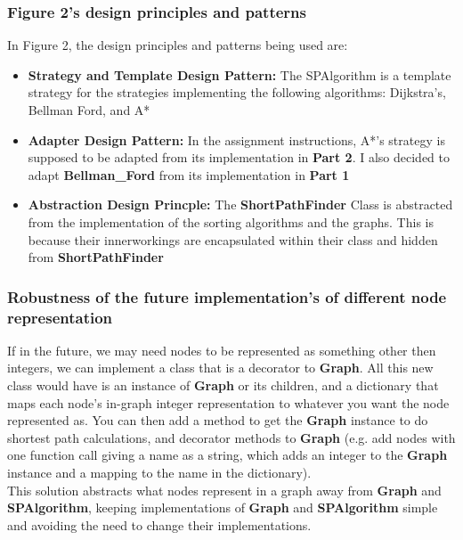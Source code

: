 \documentclass[letterpaper]{article}
\theoremstyle{plain}
\theoremstyle{definition}
\theoremstyle{remark}
\begin{document}
\subsubsection*{Figure 2's design principles and patterns}
In Figure 2, the design principles and patterns being used are:
\begin{itemize}
  \item \textbf{Strategy and Template Design Pattern:} The SPAlgorithm is a template strategy for the strategies implementing the following algorithms: Dijkstra's, Bellman Ford, and A* 
  \item \textbf{Adapter Design Pattern:} In the assignment instructions, A*'s strategy is supposed to be adapted from its implementation in \textbf{Part 2}. I also decided to adapt \textbf{Bellman\_Ford} from its implementation in \textbf{Part 1}
  \item \textbf{Abstraction Design Princple:} The \textbf{ShortPathFinder} Class is abstracted from the implementation of the sorting algorithms and the graphs. This is because their innerworkings are encapsulated within their class and hidden from \textbf{ShortPathFinder}
\end{itemize}

\subsubsection*{Robustness of the future implementation's of different node representation}
If in the future, we may need nodes to be represented as something other then integers, we can implement a class that is a decorator to \textbf{Graph}. All this new class would have is an instance of \textbf{Graph} or its children, and a dictionary that maps each node's in-graph integer representation to whatever you want the node represented as. You can then add a method to get the \textbf{Graph} instance to do shortest path calculations, and decorator methods to \textbf{Graph} (e.g. add nodes with one function call giving a name as a string, which adds an integer to the \textbf{Graph} instance and a mapping to the name in the dictionary). 
\\

This solution abstracts what nodes represent in a graph away from \textbf{Graph} and \textbf{SPAlgorithm}, keeping implementations of \textbf{Graph} and \textbf{SPAlgorithm} simple and avoiding the need to change their implementations.
\\
\end{document}
